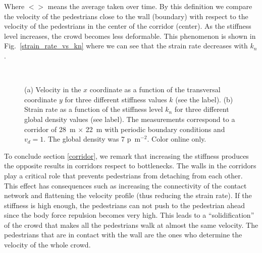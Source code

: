 \documentclass[preprint,12pt]{elsarticle}
\begin{document}
Where $<>$ means the average taken over time. By this definition we compare the velocity of the pedestrians close to the wall (boundary) with respect to the velocity of the pedestrians in the center of the corridor (center). As the stiffness level increases, the crowd becomes less deformable. This phenomenon is shown in Fig.~\ref{strain_rate_vs_kn} where we can see that the strain rate decreases with $k_n$. \\



\begin{figure}[!htbp]
\centering
    \ 
    \\
\caption[width=0.47\columnwidth]{(a) Velocity in the $x$ coordinate as a function of the transversal coordinate $y$ for three different stiffness values $k$ (see the label). (b) Strain rate as a function of the stiffness level $k_n$ for three different global density values (see label). The measurements correspond to a corridor of 28~m $\times$ 22~m with periodic boundary conditions and $v_d=1$. The global density was 7 p~m$^{-2}$. Color online only. }
\label{profile_strain}
\end{figure}


To conclude section \ref{corridor}, we remark that increasing the stiffness produces the opposite results in corridors respect to bottlenecks. The walls in the corridors play a critical role that prevents pedestrians from detaching from each other. This effect has consequences such as increasing the connectivity of the contact network and flattening the velocity profile (thus reducing the strain rate). If the stiffness is high enough, the pedestrians can not push to the pedestrian ahead since the body force repulsion becomes very high. This leads to a ``solidification'' of the crowd that makes all the pedestrians walk at almost the same velocity. The pedestrians that are in contact with the wall are the ones who determine the velocity of the whole crowd. \\
\end{document}
